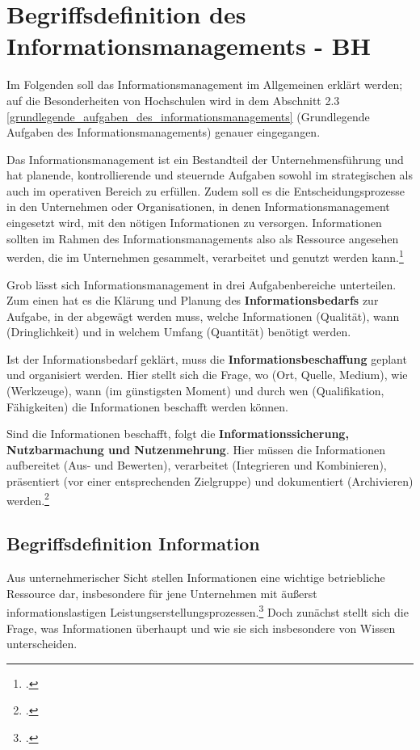 \section{Begriffsdefinition des Informationsmanagements - BH}
\label{begriffsdefinition_inm}

Im Folgenden soll das Informationsmanagement im Allgemeinen erklärt werden; auf die Besonderheiten von Hochschulen wird in dem Abschnitt 2.3 \ref{grundlegende_aufgaben_des_informationsmanagements} (Grundlegende Aufgaben des Informationsmanagements) genauer eingegangen.

Das Informationsmanagement ist ein Bestandteil der Unternehmensführung und hat planende, kontrollierende und steuernde Aufgaben sowohl im strategischen als auch im operativen Bereich zu erfüllen. Zudem soll es die Entscheidungsprozesse in den Unternehmen oder Organisationen, in denen Informationsmanagement eingesetzt wird, mit den nötigen Informationen zu versorgen. Informationen sollten im Rahmen des Informationsmanagements also als Ressource angesehen werden, die im Unternehmen gesammelt, verarbeitet und genutzt werden kann.\footcite[65-68]{voss_informationsmanagement_2001}

Grob lässt sich Informationsmanagement in drei Aufgabenbereiche unterteilen. Zum einen hat es die Klärung und Planung des \textbf{Informationsbedarfs} zur Aufgabe, in der abgewägt werden muss, welche Informationen (Qualität), wann (Dringlichkeit) und in welchem Umfang (Quantität) benötigt werden.

Ist der Informationsbedarf geklärt, muss die \textbf{Informationsbeschaffung} geplant 
und organisiert werden. Hier stellt sich die Frage, wo (Ort, Quelle, Medium), wie (Werkzeuge), wann (im günstigsten Moment) und durch wen (Qualifikation, Fähigkeiten) die Informationen beschafft werden können.

Sind die Informationen beschafft, folgt die \textbf{Informationssicherung, Nutzbarmachung und Nutzenmehrung}. Hier müssen die Informationen aufbereitet (Aus- und Bewerten), verarbeitet (Integrieren und Kombinieren), präsentiert (vor einer entsprechenden Zielgruppe) und dokumentiert (Archivieren) werden.\footcite{luepke_informationsmanagement_was_2012}

\subsection{Begriffsdefinition Information}

Aus unternehmerischer Sicht stellen Informationen eine wichtige betriebliche Ressource dar, insbesondere für jene Unternehmen mit äußerst informationslastigen Leistungserstellungsprozessen.\footcite[Vgl. u.a.][]{BiethanMukschRusch_Informationsmanagement_2004}
Doch zunächst stellt sich die Frage, was Informationen überhaupt und wie sie sich insbesondere von Wissen unterscheiden.

